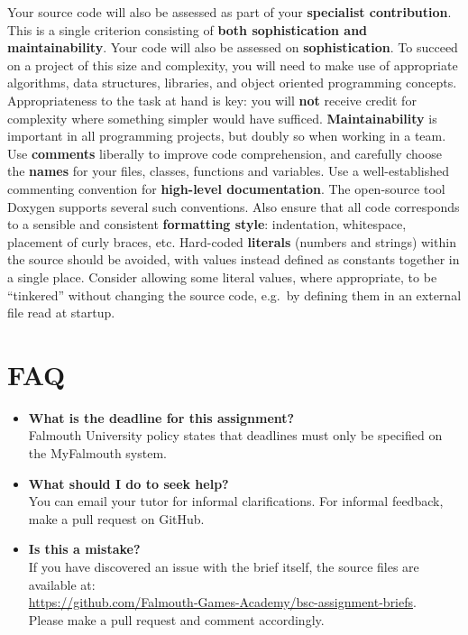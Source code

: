 \documentclass{../../fal_assignment}
\begin{document}
Your source code will also be assessed as part of your \textbf{specialist contribution}. This is a single criterion consisting of \textbf{both sophistication and maintainability}.
Your code will also be assessed on \textbf{sophistication}.
To succeed on a project of this size and complexity,
you will need to make use of appropriate algorithms, data structures, libraries, and object oriented programming concepts.
Appropriateness to the task at hand is key:
you will \textbf{not} receive credit for complexity  
where something simpler would have sufficed.
\textbf{Maintainability} is important in all programming projects,
but doubly so when working in a team.
Use \textbf{comments} liberally to improve code comprehension,
and carefully choose the \textbf{names} for your files, classes, functions and variables.
Use a well-established commenting convention
for \textbf{high-level documentation}.
The open-source tool Doxygen supports several such conventions.
Also ensure that all code corresponds to a sensible and consistent \textbf{formatting style}:
indentation, whitespace, placement of curly braces, etc.
Hard-coded \textbf{literals} (numbers and strings) within the source should be avoided,
with values instead defined as constants together in a single place.
Consider allowing some literal values, where appropriate, to be ``tinkered'' without changing the source code,
e.g.\ by defining them in an external file read at startup.

\section*{FAQ}

\begin{itemize}
	\item 	\textbf{What is the deadline for this assignment?} \\ 
    		Falmouth University policy states that deadlines must only be specified on the MyFalmouth system.
    		
	\item 	\textbf{What should I do to seek help?} \\ 
    		You can email your tutor for informal clarifications. For informal feedback, make a pull request on GitHub. 
    		
    	\item 	\textbf{Is this a mistake?} \\ 	
    		If you have discovered an issue with the brief itself, the source files are available at: \\
    		\url{https://github.com/Falmouth-Games-Academy/bsc-assignment-briefs}.\\
    		 Please make a pull request and comment accordingly.
\end{itemize}
\end{document}
